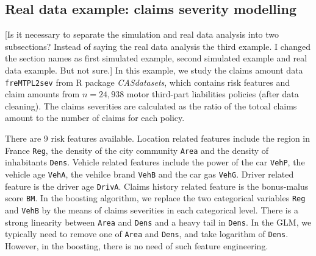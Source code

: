 \documentclass[11pt]{article}
\numberwithin{equation}{section}
\begin{document}


\subsection{Real data example: claims severity modelling}\label{sec:third example}

{\color{blue}[Is it necessary to separate the simulation and real data analysis into two subsections? Instead of saying the real data analysis the third example. I changed the section names as first simulated example, second simulated example and real data example. But not sure.]}
In this example, we study the claims amount data {\tt freMTPL2sev} from R package {\it CASdatasets}, which contains risk features and  claim amounts from $n=24,938$ motor third-part liabilities policies (after data cleaning). 
The claims severities are calculated as the ratio of the totoal claims amount to the number of claims for each policy.

There are 9 risk features available. 
Location related features include the region in France {\tt Reg}, the density of the city community {\tt Area} and the density of inhabitants {\tt Dens}.
Vehicle related features include the power of the car {\tt VehP}, the vehicle age {\tt VehA}, the vehilce brand {\tt VehB} and the car gas {\tt VehG}.
Driver related feature is the driver age {\tt DrivA}. 
Claims history related feature is the bonus-malus score  {\tt BM}.  
In the boosting algorithm, we replace the two categorical variables {\tt Reg} and {\tt VehB} by the means of claims severities in each categorical level.
There is a strong linearity between {\tt Area} and {\tt Dens} and a heavy tail in {\tt Dens}. 
In the GLM, we typically need to remove one of {\tt Area} and {\tt Dens}, and take logarithm of {\tt Dens}.
However, in the boosting, there is no need of such feature engineering.
\end{document}
